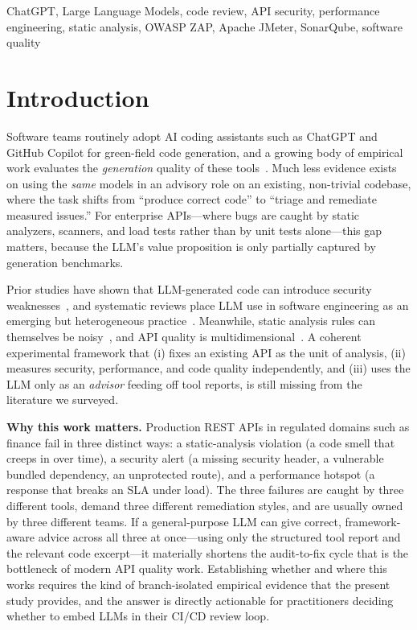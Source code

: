 \documentclass[conference]{IEEEtran}
\begin{document}
\begin{IEEEkeywords}
ChatGPT, Large Language Models, code review, API security, performance engineering, static analysis, OWASP ZAP, Apache JMeter, SonarQube, software quality
\end{IEEEkeywords}

\section{Introduction}
Software teams routinely adopt AI coding assistants such as ChatGPT and GitHub Copilot for green-field code generation, and a growing body of empirical work evaluates the \emph{generation} quality of these tools~\cite{ref1,ref2,ref8,ref10}. Much less evidence exists on using the \emph{same} models in an advisory role on an existing, non-trivial codebase, where the task shifts from ``produce correct code'' to ``triage and remediate measured issues.'' For enterprise APIs---where bugs are caught by static analyzers, scanners, and load tests rather than by unit tests alone---this gap matters, because the LLM's value proposition is only partially captured by generation benchmarks.

Prior studies have shown that LLM-generated code can introduce security weaknesses~\cite{ref11,ref12,ref13}, and systematic reviews place LLM use in software engineering as an emerging but heterogeneous practice~\cite{ref14}. Meanwhile, static analysis rules can themselves be noisy~\cite{ref15}, and API quality is multidimensional~\cite{ref5}. A coherent experimental framework that (i) fixes an existing API as the unit of analysis, (ii) measures security, performance, and code quality independently, and (iii) uses the LLM only as an \emph{advisor} feeding off tool reports, is still missing from the literature we surveyed.

\textbf{Why this work matters.} Production REST APIs in regulated domains such as finance fail in three distinct ways: a static-analysis violation (a code smell that creeps in over time), a security alert (a missing security header, a vulnerable bundled dependency, an unprotected route), and a performance hotspot (a response that breaks an SLA under load). The three failures are caught by three different tools, demand three different remediation styles, and are usually owned by three different teams. If a general-purpose LLM can give correct, framework-aware advice across all three at once---using only the structured tool report and the relevant code excerpt---it materially shortens the audit-to-fix cycle that is the bottleneck of modern API quality work. Establishing whether and where this works requires the kind of branch-isolated empirical evidence that the present study provides, and the answer is directly actionable for practitioners deciding whether to embed LLMs in their CI/CD review loop.
\end{document}
